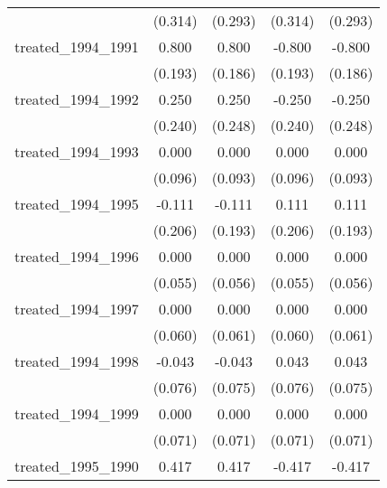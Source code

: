 {\begin{tabular}{l*{4}{c}}
            &     (0.314)         &     (0.293)         &     (0.314)         &     (0.293)         \\
[1em]
treated\_1994\_1991&       0.800\sym{***}&       0.800\sym{***}&      -0.800\sym{***}&      -0.800\sym{***}\\
            &     (0.193)         &     (0.186)         &     (0.193)         &     (0.186)         \\
[1em]
treated\_1994\_1992&       0.250         &       0.250         &      -0.250         &      -0.250         \\
            &     (0.240)         &     (0.248)         &     (0.240)         &     (0.248)         \\
[1em]
treated\_1994\_1993&       0.000         &       0.000         &       0.000         &       0.000         \\
            &     (0.096)         &     (0.093)         &     (0.096)         &     (0.093)         \\
[1em]
treated\_1994\_1995&      -0.111         &      -0.111         &       0.111         &       0.111         \\
            &     (0.206)         &     (0.193)         &     (0.206)         &     (0.193)         \\
[1em]
treated\_1994\_1996&       0.000         &       0.000         &       0.000         &       0.000         \\
            &     (0.055)         &     (0.056)         &     (0.055)         &     (0.056)         \\
[1em]
treated\_1994\_1997&       0.000         &       0.000         &       0.000         &       0.000         \\
            &     (0.060)         &     (0.061)         &     (0.060)         &     (0.061)         \\
[1em]
treated\_1994\_1998&      -0.043         &      -0.043         &       0.043         &       0.043         \\
            &     (0.076)         &     (0.075)         &     (0.076)         &     (0.075)         \\
[1em]
treated\_1994\_1999&       0.000         &       0.000         &       0.000         &       0.000         \\
            &     (0.071)         &     (0.071)         &     (0.071)         &     (0.071)         \\
[1em]
treated\_1995\_1990&       0.417         &       0.417         &      -0.417         &      -0.417         \\

\end{tabular}}
